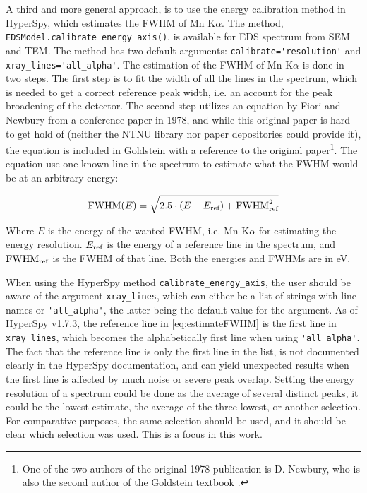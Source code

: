 A third and more general approach, is to use the energy calibration method in HyperSpy, which estimates the FWHM of Mn K$\alpha$.
The method, \verb|EDSModel.calibrate_energy_axis()|, is available for EDS spectrum from SEM and TEM.
The method has two default arguments: \verb|calibrate='resolution'| and \verb|xray_lines='all_alpha'|.
The estimation of the FWHM of Mn K$\alpha$ is done in two steps.
The first step is to fit the width of all the lines in the spectrum, which is needed to get a correct reference peak width, i.e. an account for the peak broadening of the detector.
The second step utilizes an equation by Fiori and Newbury from a conference paper in 1978, and while this original paper is hard to get hold of (neither the NTNU library nor paper depositories could provide it), the equation is included in Goldstein \cite[Ch. 16.1.1]{goldstein_scanning_2018} with a reference to the original paper\footnote{One of the two authors of the original 1978 publication is D. Newbury, who is also the second author of the Goldstein textbook \cite{goldstein_scanning_2018}.}.
The equation use one known line in the spectrum to estimate what the FWHM would be at an arbitrary energy:

\begin{equation}
    \label{eq:estimateFWHM}
    \textnormal{FWHM}(E) =  \sqrt{2.5 \cdot (E - E_\textnormal{ref}) + \textnormal{FWHM}^2_{\textnormal{ref}}}
\end{equation}

Where $E$ is the energy of the wanted FWHM, i.e. Mn K$\alpha$ for estimating the energy resolution.
$E_\textnormal{ref}$ is the energy of a reference line in the spectrum, and $\textnormal{FWHM}_{\textnormal{ref}}$ is the FWHM of that line.
Both the energies and FWHMs are in eV.

When using the HyperSpy method \verb|calibrate_energy_axis|, the user should be aware of the argument \verb|xray_lines|, which can either be a list of strings with line names or \verb|'all_alpha'|, the latter being the default value for the argument.
As of HyperSpy v1.7.3, the reference line in \cref{eq:estimateFWHM} is the first line in \verb|xray_lines|, which becomes the alphabetically first line when using \verb|'all_alpha'|.
The fact that the reference line is only the first line in the list, is not documented clearly in the HyperSpy documentation, and can yield unexpected results when the first line is affected by much noise or severe peak overlap.
Setting the energy resolution of a spectrum could be done as the average of several distinct peaks, it could be the lowest estimate, the average of the three lowest, or another selection.
For comparative purposes, the same selection should be used, and it should be clear which selection was used.
This is a focus in this work.


